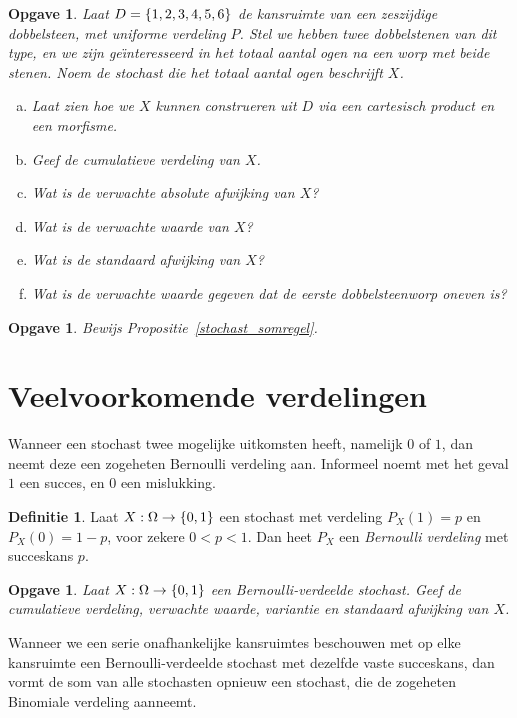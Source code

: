 \documentclass[a4paper]{book}
\newtheorem{exercise}[theorem]{Opgave}
\theoremstyle{definition}
\newtheorem{definition}[theorem]{Definitie}
\begin{document}
\begin{exercise}
    Laat $D = \set{1,2,3,4,5,6}$ de kansruimte van een zeszijdige dobbelsteen, met uniforme verdeling $P$.
    Stel we hebben twee dobbelstenen van dit type, en we zijn ge\"{\i}nteresseerd in het totaal aantal ogen na een worp met beide stenen.
    Noem de stochast die het totaal aantal ogen beschrijft $X$.
    \begin{enumerate}[a.]
    \item Laat zien hoe we $X$ kunnen construeren uit $D$ via een cartesisch product en een morfisme.
    \item Geef de cumulatieve verdeling van $X$.
    \item Wat is de verwachte absolute afwijking van $X$?
    \item Wat is de verwachte waarde van $X$?
    \item Wat is de standaard afwijking van $X$?
    \item Wat is de verwachte waarde gegeven dat de eerste dobbelsteenworp oneven is?
    \end{enumerate}
\end{exercise}

\begin{exercise}
    Bewijs Propositie~\ref{stochast_somregel}.
\end{exercise}

\section{Veelvoorkomende verdelingen}
Wanneer een stochast twee mogelijke uitkomsten heeft, namelijk $0$ of $1$, dan neemt deze een zogeheten Bernoulli verdeling aan.
Informeel noemt met het geval $1$ een succes, en $0$ een mislukking.

\begin{definition}
    Laat $X : \Omega \to \set{0,1}$ een stochast met verdeling
    $P_X(1) = p$ en $P_X(0) = 1 - p$, voor zekere $0 < p < 1$.
    Dan heet $P_X$ een \emph{Bernoulli verdeling} met succeskans $p$.
\end{definition}

\begin{exercise}
    Laat $X : \Omega \to \set{0,1}$ een Bernoulli-verdeelde stochast.
    Geef de cumulatieve verdeling, verwachte waarde, variantie en standaard afwijking van $X$.
\end{exercise}

Wanneer we een serie onafhankelijke kansruimtes beschouwen met op elke kansruimte een Bernoulli-verdeelde stochast met dezelfde vaste succeskans,
dan vormt de som van alle stochasten opnieuw een stochast, die de zogeheten Binomiale verdeling aanneemt.
\end{document}

